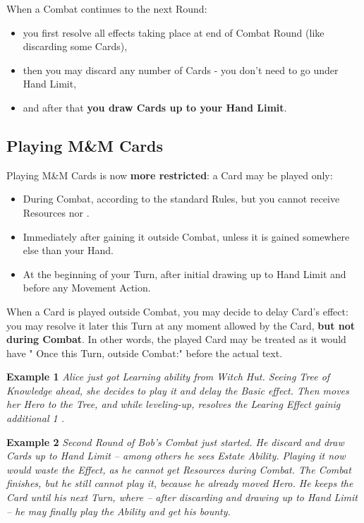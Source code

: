 \begin{multicols*}{2}
    When a Combat continues to the next Round: \begin{itemize}
        \item you first resolve all effects taking place at end of Combat Round (like discarding some  Cards),
        \item then you may discard any number of Cards - you don't need to go under Hand Limit,
        \item and after that \textbf{you draw Cards up to your Hand Limit}.
    \end{itemize}
    
    \subsection*{Playing M\&M Cards}
    
    Playing M\&M Cards is now \textbf{more restricted}: a Card may be played only: \begin{itemize}
        \item During Combat, according to the standard Rules, but you cannot receive Resources nor .
        \item Immediately after gaining it outside Combat, unless it is gained somewhere else than your Hand.
        \item At the beginning of your Turn, after initial drawing up to Hand Limit and before any Movement Action.
    \end{itemize}
    
    When a Card is played outside Combat, you may decide to delay Card's effect: you may resolve it later this Turn at any moment allowed by the Card, \textbf{but not during Combat}. In other words, the played Card may be treated as it would have " Once this Turn, outside Combat:" before the actual text.
    
    \medskip
    
    
    \textbf{Example 1} \textit{Alice just got Learning ability from Witch Hut. Seeing Tree of Knowledge ahead, she decides to play it and delay the Basic effect. Then moves her Hero to the Tree, and while leveling-up, resolves the Learing Effect gainig additional 1 .}
    
    \textbf{Example 2} \textit{Second Round of Bob's Combat just started. He discard and draw Cards up to Hand Limit -- among others he sees Estate Ability. Playing it now would waste the Effect, as he cannot get Resources during Combat. The Combat finishes, but he still cannot play it, because he already moved Hero. He keeps the Card until his next Turn, where -- after discarding and drawing up to Hand Limit -- he may finally play the Ability and get his bounty.}
            

\end{multicols*}
